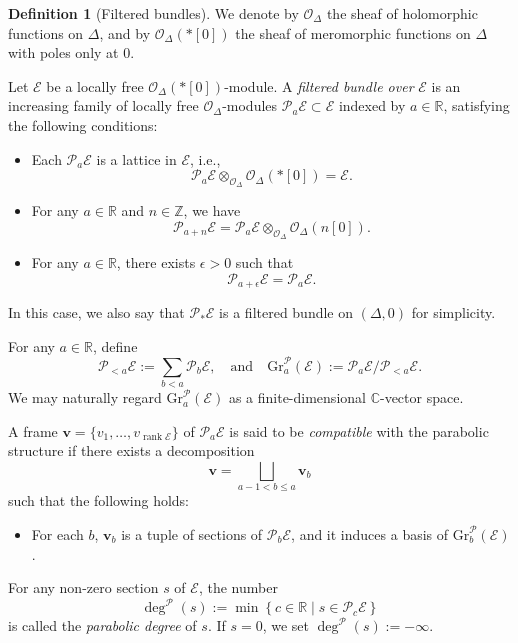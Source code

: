 \documentclass[12pt,twoside]{amsart}
\DeclareMathOperator{\rank}{rank}
\theoremstyle{definition}
\newtheorem{defn}[thm]{Definition}
\begin{document}
\begin{defn}[Filtered bundles]\label{p-def8.2}
We denote by $\mathcal{O}_\Delta$ the sheaf of 
holomorphic functions on $\Delta$, and by 
$\mathcal{O}_\Delta(*[0])$ the sheaf of meromorphic functions on $\Delta$ with poles only at $0$. 

Let $\mathcal{E}$ be a locally free $\mathcal{O}_\Delta(*[0])$-module.  
A {\em filtered bundle over} $\mathcal{E}$ is 
an increasing family of locally free $\mathcal{O}_\Delta$-modules 
$\mathcal{P}_a \mathcal{E} \subset \mathcal{E}$ 
indexed by $a \in \mathbb{R}$, satisfying the following conditions:
\begin{itemize}
\item[(1)] Each $\mathcal{P}_a \mathcal{E}$ is a lattice in $\mathcal{E}$, i.e.,
\[
\mathcal{P}_a \mathcal{E} \otimes_{\mathcal{O}_\Delta} 
\mathcal{O}_\Delta(*[0]) = \mathcal{E}.
\]
\item[(2)] For any $a \in \mathbb{R}$ and $n \in \mathbb{Z}$, we have
\[
\mathcal{P}_{a+n} \mathcal{E} = 
\mathcal{P}_a \mathcal{E} \otimes_{\mathcal{O}_\Delta} \mathcal{O}_\Delta(n  [0]).
\]
\item[(3)] For any $a \in \mathbb{R}$, 
there exists $\epsilon > 0$ such that
\[
\mathcal{P}_{a+\epsilon} \mathcal{E} 
= \mathcal{P}_a \mathcal{E}.
\]
\end{itemize}
In this case, we also say 
that $\mathcal{P}_\ast \mathcal{E}$ is a 
filtered bundle on $(\Delta, 0)$ for simplicity.

For any $a \in \mathbb{R}$, define
\[
\mathcal{P}_{<a} \mathcal{E} := \sum_{b < a} \mathcal{P}_b \mathcal{E},
\quad \text{and} \quad
\mathrm{Gr}^\mathcal{P}_a(\mathcal{E}) := 
\mathcal{P}_a \mathcal{E} / \mathcal{P}_{<a} \mathcal{E}.
\]
We may naturally regard $\mathrm{Gr}^\mathcal{P}_a(\mathcal{E})$ as a 
finite-dimensional $\mathbb{C}$-vector space.

A frame $\bm{v} = \{v_1, \dots, v_{\rank\mathcal{E}}\}$ of 
$\mathcal{P}_a \mathcal{E}$ is said to be 
{\em compatible} with the parabolic structure if there exists a decomposition
\[
\bm{v} = \bigsqcup_{a-1 < b \leq a} \bm{v}_b
\]
such that the following holds:
\begin{itemize}
\item For each $b$, $\bm{v}_b$ is a tuple of 
sections of $\mathcal{P}_b \mathcal{E}$, and 
it induces a basis of $\mathrm{Gr}^\mathcal{P}_b(\mathcal{E})$.
\end{itemize}

For any non-zero section $s$ of $\mathcal{E}$, the number
\[
\deg^\mathcal{P}(s) := \min\left\{ c \in \mathbb{R} \mid 
s \in \mathcal{P}_c \mathcal{E} \right\}
\]
is called the {\em parabolic degree} of $s$.  
If $s = 0$, we set $\deg^\mathcal{P}(s) := -\infty$.
\end{defn}
\end{document}

